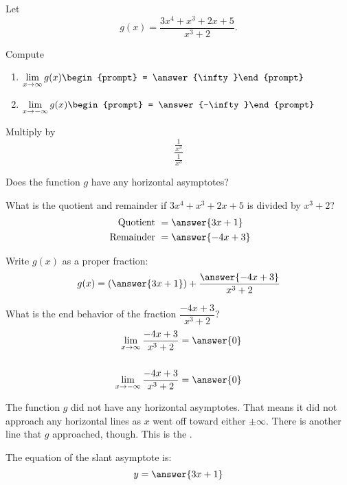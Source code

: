 \documentclass{ximera}
\author{Bobby Ramsey}
\begin{document}
\begin{exercise}
	Let \[ g(x) = \frac{3x^4+x^3+2x+5}{x^3+2}. \]
	
	Compute

	\begin{enumerate}
		\item $\displaystyle \lim_{x\to \infty} g(x) \begin{prompt} = \answer{\infty}\end{prompt}$
		\item $\displaystyle \lim_{x\to -\infty}g(x) \begin{prompt} = \answer{-\infty}\end{prompt}$
	\end{enumerate}

	\begin{hint}
		Multiply by \[\frac{\frac{1}{x^3}}{\frac{1}{x^3}}\]
	\end{hint}

	\begin{exercise}
		Does the function $g$ have any horizontal asymptotes?
		\begin{multipleChoice}
		\end{multipleChoice}
		
		\begin{exercise}
			What is the quotient and remainder if $3x^4+x^3+2x+5$ is divided by $x^3+2$?
			\begin{align*}
				\text{ Quotient } &= \answer{3x+1}\\
				\text{ Remainder } &= \answer{-4x+3}	
			\end{align*}
			\begin{exercise}
				Write $g(x)$ as a proper fraction:
				\[ g(x) = \left( \answer{3x+1} \right) + \frac{\answer{-4x+3}}{x^3+2} \]
				\begin{exercise}
					What is the end behavior of the fraction $\dfrac{-4x+3}{x^3+2}$?
					\begin{align*}
						\lim_{x\to \infty} \frac{-4x+3}{x^3+2} &= \answer{0} \\ \\
						\lim_{x\to -\infty} \frac{-4x+3}{x^3+2} &= \answer{0} \\
					\end{align*}
					\begin{exercise}
						The function $g$ did not have any horizontal asymptotes.  That means it did not approach any horizontal lines as $x$ went off toward either $\pm \infty$.
						There is another line that $g$ approached, though.  This is the .
						\begin{exercise}	
							The equation of the slant asymptote is:
							\[ y = \answer{3x+1} \]
						\end{exercise}
					\end{exercise}
				\end{exercise}
			\end{exercise}
		\end{exercise}
	\end{exercise}
\end{exercise}
\end{document}
